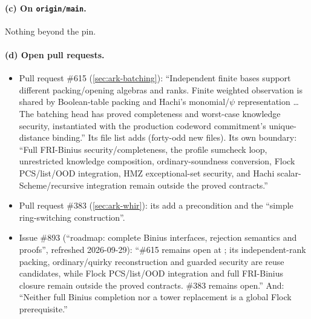 \paragraph{(c) On \texttt{origin/main}.}
Nothing beyond the pin.

\paragraph{(d) Open pull requests.}
\begin{itemize}
\item Pull request \#615 (\cref{sec:ark-batching}): ``Independent finite bases support different
  packing/opening algebras and ranks. Finite weighted observation is shared by Boolean-table
  packing and Hachi's monomial/$\psi$ representation \ldots{} The batching head has proved
  completeness and worst-case knowledge security, instantiated with the production codeword
  commitment's unique-distance binding.'' Its file list adds
  (forty-odd new files). Its own boundary: ``Full FRI-Binius security/completeness, the profile
  sumcheck loop, unrestricted knowledge composition, ordinary-soundness conversion, Flock
  PCS/list/OOD integration, HMZ exceptional-set security, and Hachi scalar-Scheme/recursive
  integration remain outside the proved contracts.''
\item Pull request \#383 (\cref{sec:ark-whir}): its
   add a
   precondition and the ``simple ring-switching construction''.
\item Issue \#893 (``roadmap: complete Binius interfaces, rejection semantics and proofs'',
  refreshed 2026-09-29): ``\#615 remains open at ; its independent-rank packing,
  ordinary/quirky reconstruction and guarded security are reuse candidates, while Flock
  PCS/list/OOD integration and full FRI-Binius closure remain outside the proved contracts.
  \#383 remains open.'' And: ``Neither full Binius completion nor a tower replacement is a global
  Flock prerequisite.''
\end{itemize}

